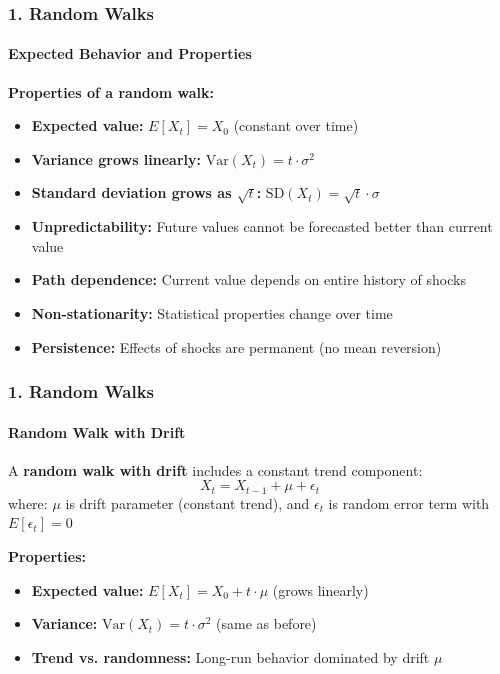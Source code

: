 \documentclass{beamer}
\begin{document}
\begin{foundframe}[t]
    \frametitle{1. Random Walks}
    \framesubtitle{Expected Behavior and Properties}

    \textbf{Properties of a random walk:}

    \begin{itemize}
        \item \textbf{Expected value:} $E[X_t] = X_0$ (constant over time)
        \item \textbf{Variance grows linearly:} $\text{Var}(X_t) = t \cdot \sigma^2$
        \item \textbf{Standard deviation grows as $\sqrt{t}$:} $\text{SD}(X_t) = \sqrt{t} \cdot \sigma$
        \item \textbf{Unpredictability:} Future values cannot be forecasted better than current value
        \item \textbf{Path dependence:} Current value depends on entire history of shocks
        \item \textbf{Non-stationarity:} Statistical properties change over time
        \item \textbf{Persistence:} Effects of shocks are permanent (no mean reversion)
    \end{itemize}
    \vspace{1em}

\end{foundframe}

\begin{foundframe}[t]
    \frametitle{1. Random Walks}
    \framesubtitle{Random Walk with Drift}

    A \textbf{random walk with drift} includes a constant trend component:
    $$X_t = X_{t-1} + \mu + \epsilon_t$$
    where: $\mu$ is drift parameter (constant trend), 
    and $\epsilon_t$ is random error term with $E[\epsilon_t] = 0$
    \vspace{1em}

    \textbf{Properties:}
    \begin{itemize}
        \item \textbf{Expected value:} $E[X_t] = X_0 + t \cdot \mu$ (grows linearly)
        \item \textbf{Variance:} $\text{Var}(X_t) = t \cdot \sigma^2$ (same as before)
        \item \textbf{Trend vs. randomness:} Long-run behavior dominated by drift $\mu$
    \end{itemize}
    \vspace{1em}

\end{foundframe}
\end{document}
